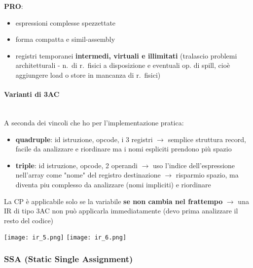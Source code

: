 \textbf{PRO}:
\begin{itemize}
  \item espressioni complesse spezzettate
  \item forma compatta e simil-assembly
  \item registri temporanei \textbf{intermedi, virtuali e illimitati} (tralascio problemi architetturali - n.~di r.~fisici a disposizione e eventuali op. di spill, cio\`e aggiungere load o store in mancanza di r.~fisici)
\end{itemize}

\paragraph{Varianti di 3AC}~\\

A seconda dei vincoli che ho per l'implementazione pratica:\\

\noindent\begin{minipage}[c]{.7\textwidth}
\begin{itemize}
  \item \textbf{quadruple}: id istruzione, opcode, i 3 registri $\rightarrow$ semplice struttura record, facile da analizzare e riordinare ma i nomi espliciti prendono pi\`u spazio
  \item \textbf{triple}: id istruzione, opcode, 2 operandi $\rightarrow$ uso l'indice dell'espressione nell'array come "nome" del registro destinazione $\rightarrow$ risparmio spazio, ma diventa piu complesso da analizzare (nomi impliciti) e riordinare
\end{itemize}
\begin{emphasize}[frametitle={Inapplicabilit\`a diretta della Constant Propagation con forma 3AC}]
  La CP \`e applicabile solo se la variabile \textbf{se non cambia nel frattempo} $\rightarrow$ una IR di tipo 3AC non pu\`o applicarla immediatamente (devo prima analizzare il resto del codice)
\end{emphasize}
\end{minipage}
\begin{minipage}[c]{.3\textwidth}
\centering
\texttt{[image: ir\_5.png]}
\texttt{[image: ir\_6.png]}
\end{minipage}

\subsubsection{SSA (Static Single Assignment)}

